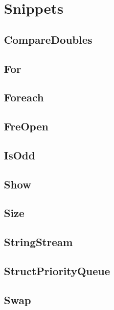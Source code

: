\section{Snippets}
\subsection{ CompareDoubles}
\raggedbottom
\hrulefill
\subsection{ For}
\raggedbottom
\hrulefill
\subsection{ Foreach}
\raggedbottom
\hrulefill
\subsection{ FreOpen}
\raggedbottom
\hrulefill
\subsection{ IsOdd}
\raggedbottom
\hrulefill
\subsection{ Show}
\raggedbottom
\hrulefill
\subsection{ Size}
\raggedbottom
\hrulefill
\subsection{ StringStream}
\raggedbottom
\hrulefill
\subsection{ StructPriorityQueue}
\raggedbottom
\hrulefill
\subsection{ Swap}
\raggedbottom
\hrulefill
